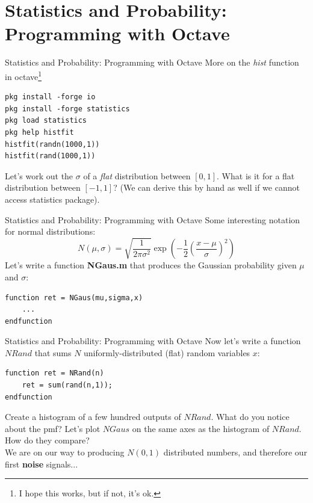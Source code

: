\documentclass{beamer}
\begin{document}
\section{Statistics and Probability: Programming with Octave}

\begin{frame}[fragile]{Statistics and Probability: Programming with Octave}
More on the \textit{hist} function in octave\footnote{I hope this works, but if not, it's ok.}
\begin{verbatim}
pkg install -forge io
pkg install -forge statistics
pkg load statistics
pkg help histfit
histfit(randn(1000,1))
histfit(rand(1000,1))
\end{verbatim}
Let's work out the $\sigma$ of a \textit{flat} distribution between $[0,1]$.  What is it for a flat distribution between $[-1,1]$?  (We can derive this by hand as well if we cannot access statistics package).
\end{frame}

\begin{frame}[fragile]{Statistics and Probability: Programming with Octave}
Some interesting notation for normal distributions:
\begin{equation}
N(\mu,\sigma) = \sqrt{\frac{1}{2\pi\sigma^2}} \exp\left(-\frac{1}{2}\left(\frac{x-\mu}{\sigma}\right)^2\right)
\end{equation}
Let's write a function \textbf{NGaus.m} that produces the Gaussian probability given $\mu$ and $\sigma$:
\begin{verbatim}
function ret = NGaus(mu,sigma,x)
    ...
endfunction
\end{verbatim}
\end{frame}

\begin{frame}[fragile]{Statistics and Probability: Programming with Octave}
Now let's write a function $NRand$ that sums $N$ uniformly-distributed (flat) random variables $x$:
\begin{verbatim}
function ret = NRand(n)
    ret = sum(rand(n,1));
endfunction
\end{verbatim}
Create a histogram of a few hundred outputs of $NRand$.  What do you notice about the pmf?  Let's plot $NGaus$ on the same axes as the histogram of $NRand$.  How do they compare? \\ \vspace{0.5cm}
We are on our way to producing $N(0,1)$ distributed numbers, and therefore our first \textbf{\alert{noise}} signals...
\end{frame}
\end{document}

